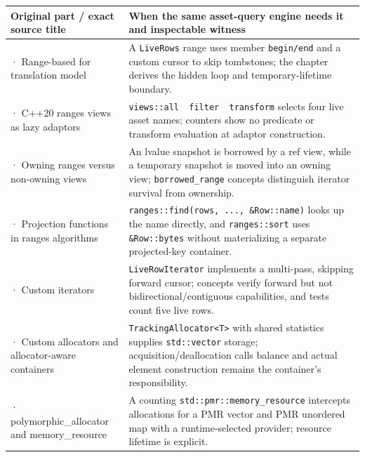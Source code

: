 {\def\LTcaptype{none} %
\begin{longtable}[]{@{}
  >{\raggedright\arraybackslash}p{}
  >{\raggedright\arraybackslash}p{}@{}}
\toprule\noalign{}
\begin{minipage}[b]{\linewidth}\raggedright
Original part / exact source title
\end{minipage} & \begin{minipage}[b]{\linewidth}\raggedright
When the same asset-query engine needs it and inspectable witness
\end{minipage} \\
\midrule\noalign{}
\endhead
\bottomrule\noalign{}
\endlastfoot
271 · Range-based for translation model & A \texttt{LiveRows} range uses member \texttt{begin/end} and a custom cursor to skip tombstones; the chapter derives the hidden loop and temporary-lifetime boundary. \\
272 · C++20 ranges views as lazy adaptors & \texttt{views::all\ \textbar{}\ filter\ \textbar{}\ transform} selects four live asset names; counters show no predicate or transform evaluation at adaptor construction. \\
273 · Owning ranges versus non-owning views & An lvalue snapshot is borrowed by a ref view, while a temporary snapshot is moved into an owning view; \texttt{borrowed\_range} concepts distinguish iterator survival from ownership. \\
274 · Projection functions in ranges algorithms & \texttt{ranges::find(rows,\ ...,\ \&Row::name)} looks up the name directly, and \texttt{ranges::sort} uses \texttt{\&Row::bytes} without materializing a separate projected-key container. \\
275 · Custom iterators & \texttt{LiveRowIterator} implements a multi-pass, skipping forward cursor; concepts verify forward but not bidirectional/contiguous capabilities, and tests count five live rows. \\
276 · Custom allocators and allocator-aware containers & \texttt{TrackingAllocator\textless{}T\textgreater{}} with shared statistics supplies \texttt{std::vector} storage; acquisition/deallocation calls balance and actual element construction remains the container's responsibility. \\
277 · polymorphic\_allocator and memory\_resource & A counting \texttt{std::pmr::memory\_resource} intercepts allocations for a PMR vector and PMR unordered map with a runtime-selected provider; resource lifetime is explicit. \\

\end{longtable}}

